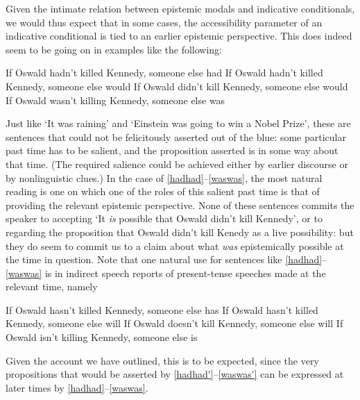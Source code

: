 \documentclass[If.tex]{subfiles}
\begin{document}
Given the intimate relation between epistemic modals and indicative conditionals, we would thus expect that in some cases, the accessibility parameter of an indicative conditional is tied to an earlier epistemic perspective. This does indeed seem to be going on in examples like the following:
\begin{prop}
	\nitem
	\begin{prop}
		\aitem \label{hadhad}
		If Oswald hadn't killed Kennedy, someone else had 
		\aitem \label{hadwould} 
		If Oswald hadn't killed Kennedy, someone else would 
		\aitem \label{didwould} 
		If Oswald didn't kill Kennedy, someone else would %
		\aitem \label{waswas} 
		If Oswald wasn't killing Kennedy, someone else was
	\end{prop}
\end{prop}
Just like ‘It was raining’ and ‘Einstein was going to win a Nobel Prize’, these are sentences that could not be felicitously asserted out of the blue: some particular past time has to be salient, and the proposition asserted is in some way about that time. (The required salience could be achieved either by earlier discourse or by nonlinguistic clues.) In the case of \ref{hadhad}--\ref{waswas}, the most natural reading is one on which one of the roles of this salient past time is that of providing the relevant epistemic perspective. None of these sentences commits the speaker to accepting ‘It \emph{is} possible that Oswald didn't kill Kennedy’, or to regarding the proposition that Oswald didn't kill Kenedy as a live possibility: but they do seem to commit us to a claim about what \emph{was} epistemically possible at the time in question. Note that one natural use for sentences like \ref{hadhad}--\ref{waswas} is in indirect speech reports of present-tense speeches made at the relevant time, namely
\begin{prop}
	\nitem
		\begin{prop}
			\aitem \label{hadhad'} 
			If Oswald hasn't killed Kennedy, someone else has 
			\aitem \label{hadwould'} 
			If Oswald hasn't killed Kennedy, someone else will 
			\aitem \label{didwould'} 
			If Oswald doesn't kill Kennedy, someone else will %
			\aitem \label{waswas'} 
			If Oswald isn't killing Kennedy, someone else is
		\end{prop}
\end{prop}
Given the account we have outlined, this is to be expected, since the very propositions that would be asserted by \ref{hadhad'}--\ref{waswas'} can be expressed at later times by \ref{hadhad}--\ref{waswas}.
\end{document}
